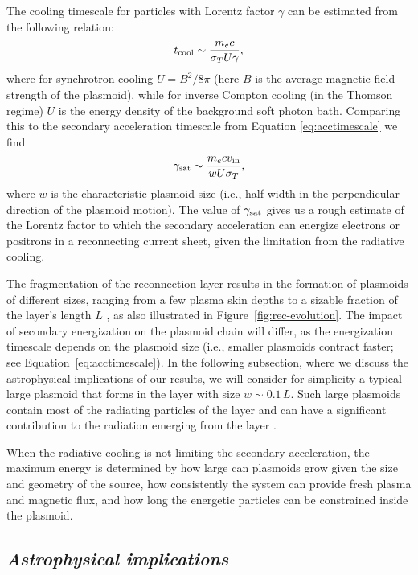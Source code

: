 The cooling timescale for particles with Lorentz factor $\gamma$ can be estimated from the following relation:
\begin{equation}
    t_{\rm cool} \sim \frac{m_e c}{\sigma_T U \gamma},
\end{equation}
where for synchrotron cooling $U=B^2/8\pi$ (here $B$ is the average magnetic field strength of the plasmoid), while for inverse Compton cooling (in the Thomson regime) $U$ is the energy density of the background soft photon bath. Comparing this to the secondary acceleration timescale from Equation \eqref{eq:acctimescale} we find
\begin{equation}
    \label{eq:gammacrit}
    \gamma_{\rm sat} \sim \frac{m_e c v_{\rm in}}{w U \sigma_T},
\end{equation}
where $w$ is the characteristic plasmoid size (i.e., half-width in the perpendicular direction of the plasmoid motion). The value of $\gamma_{\rm sat}$ gives us a rough estimate of the Lorentz factor to which the secondary acceleration can energize electrons or positrons in a reconnecting current sheet, given the limitation from the radiative cooling. 

The fragmentation  of the reconnection layer results in the formation of plasmoids of different sizes, ranging from a few plasma skin depths to a sizable fraction of the layer's length $L$ \citep[e.g.,][]{2007PhPl...14j0703L, 2010PhRvL.105w5002U, 2016MNRAS.462...48S}, as also illustrated in Figure~\ref{fig:rec-evolution}. The impact of secondary energization on the plasmoid chain will differ, as the energization timescale depends on the plasmoid size (i.e., smaller plasmoids contract faster; see Equation~\ref{eq:acctimescale}). In the following subsection, where we discuss the astrophysical implications of our results, we will consider for simplicity a typical large plasmoid that forms in the layer with size $w\sim 0.1 \, L$. Such large plasmoids contain most of the radiating particles of the layer and can have a significant contribution to the radiation emerging from the layer \citep[see, e.g.,][]{2016MNRAS.462.3325P,2018MNRAS.475.3797P}.

When the radiative cooling is not limiting the secondary acceleration, the maximum energy is determined by how large can plasmoids grow given the size and geometry of the source, how consistently the system can provide fresh plasma and magnetic flux, and how long the energetic particles can be constrained inside the plasmoid.

\subsection*{\small\it Astrophysical implications} 

